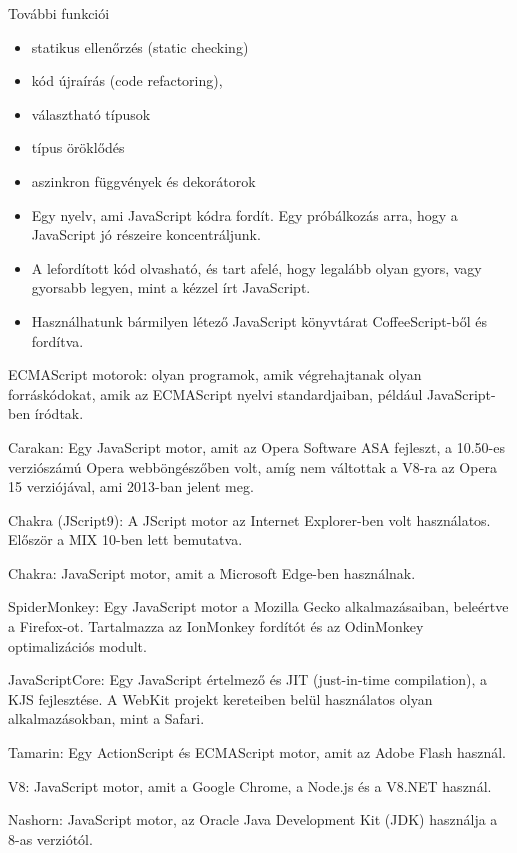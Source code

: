 További funkciói

\begin{itemize}
\item statikus ellenőrzés (static checking)
\item kód újraírás (code refactoring),
\item választható típusok
\item típus öröklődés
\item aszinkron függvények és dekorátorok
\end{itemize}


\begin{itemize}
\item Egy nyelv, ami JavaScript kódra fordít. Egy próbálkozás arra, hogy a JavaScript jó részeire koncentráljunk. 
\item A lefordított kód olvasható, és tart afelé, hogy legalább olyan gyors, vagy gyorsabb legyen, mint a kézzel írt JavaScript.
\item Használhatunk bármilyen létező JavaScript könyvtárat CoffeeScript-ből és fordítva.
\end{itemize}


ECMAScript motorok: olyan programok, amik végrehajtanak olyan forráskódokat, amik az ECMAScript nyelvi standardjaiban, például JavaScript-ben íródtak.

Carakan: Egy JavaScript motor, amit az Opera Software ASA fejleszt, a 10.50-es verziószámú Opera webböngészőben volt, amíg nem váltottak a V8-ra az Opera 15 verziójával, ami 2013-ban jelent meg.

Chakra (JScript9): A JScript motor az Internet Explorer-ben volt használatos. Először a MIX 10-ben lett bemutatva.

Chakra: JavaScript motor, amit a Microsoft Edge-ben használnak.

SpiderMonkey: Egy JavaScript motor a Mozilla Gecko alkalmazásaiban, beleértve a Firefox-ot. Tartalmazza az IonMonkey fordítót és az OdinMonkey optimalizációs modult.

JavaScriptCore: Egy JavaScript értelmező és JIT (just-in-time compilation), a KJS fejlesztése. A WebKit projekt kereteiben belül használatos olyan alkalmazásokban, mint a Safari.

Tamarin: Egy ActionScript és ECMAScript motor, amit az Adobe Flash használ.

V8: JavaScript motor, amit a Google Chrome, a Node.js és a V8.NET használ.

Nashorn: JavaScript motor, az Oracle Java Development Kit (JDK) használja
a 8-as verziótól.

